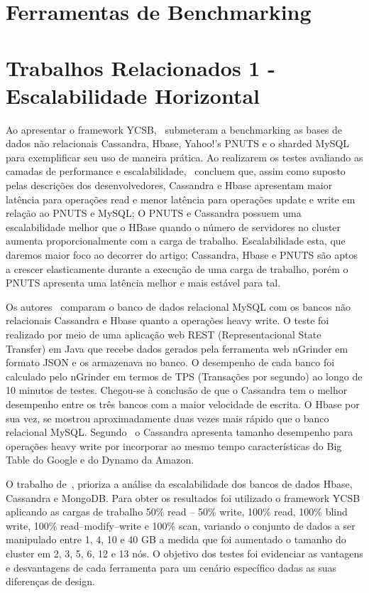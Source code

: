 \documentclass[a4paper,12pt,onecolumn,titlepage]{article}
\begin{document}
\section{Ferramentas de Benchmarking}
\label{sec:ferramentas}

\section{Trabalhos Relacionados 1 - Escalabilidade Horizontal}
\label{sec:relacionados1}

Ao apresentar o framework YCSB,~\cite{cooper:2010} submeteram a benchmarking as bases de dados não relacionais Cassandra, Hbase, Yahoo!'s PNUTS e o sharded MySQL para exemplificar seu uso de maneira prática. Ao realizarem os testes avaliando as camadas de performance e escalabilidade,~\cite{cooper:2010} concluem que, assim como suposto pelas descrições dos desenvolvedores, Cassandra e Hbase apresentam maior latência para operações read e menor latência para operações update e write em relação ao PNUTS e MySQL; O PNUTS e Cassandra possuem uma escalabilidade melhor que o HBase quando o número de servidores no cluster aumenta proporcionalmente com a carga de trabalho. Escalabilidade esta, que daremos maior foco ao decorrer do artigo; Cassandra, Hbase e PNUTS são aptos a crescer elasticamente durante a execução de uma carga de trabalho, porém o PNUTS apresenta uma latência melhor e mais estável para tal.

Os autores~\cite{jogi:2016} comparam o banco de dados relacional MySQL com os bancos não relacionais Cassandra e Hbase quanto a operações heavy write. O teste foi realizado por meio de uma aplicação web REST (Representacional State Transfer) em Java que recebe dados gerados pela ferramenta web nGrinder em formato JSON e os armazenava no banco. O desempenho de cada banco foi calculado pelo nGrinder em termos  de TPS (Transações por segundo) ao longo de 10 minutos de testes. Chegou-se à conclusão de que o Cassandra tem o melhor desempenho entre os três bancos com a maior velocidade de escrita. O Hbase por sua vez, se mostrou aproximadamente duas vezes mais rápido que o banco relacional MySQL. Segundo~\cite{jogi:2016} o Cassandra apresenta tamanho desempenho para operações heavy write por incorporar ao mesmo tempo características do Big Table do Google e do Dynamo da Amazon.

O trabalho de~\cite{swaminathan:2016}, prioriza a análise da escalabilidade dos bancos de dados Hbase, Cassandra e MongoDB. Para obter os resultados foi utilizado o framework YCSB aplicando as cargas de trabalho 50\% read – 50\% write, 100\% read, 100\% blind write, 100\% read–modify–write e 100\% scan, variando o conjunto de dados a ser manipulado entre 1, 4, 10 e 40 GB a medida que foi aumentado o tamanho do cluster em 2, 3, 5, 6, 12 e 13 nós. O objetivo dos testes foi evidenciar as vantagens e desvantagens de cada ferramenta para um cenário específico dadas as suas diferenças de design.
\end{document}
